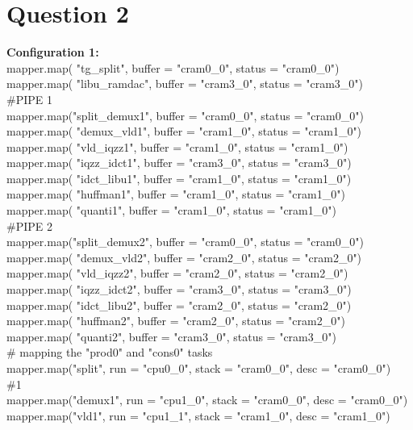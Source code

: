 \documentclass[12pt]{article}
\begin{document}
\section*{Question 2}
\textbf{Configuration 1:}\\
mapper.map( "tg\_split",    buffer = "cram0\_0", status = "cram0\_0")\\
mapper.map( "libu\_ramdac", buffer = "cram3\_0", status = "cram3\_0")\\
\#PIPE 1\\
mapper.map("split\_demux1", buffer = "cram0\_0", status = "cram0\_0")\\
mapper.map( "demux\_vld1",  buffer = "cram1\_0", status = "cram1\_0")\\
mapper.map( "vld\_iqzz1",   buffer = "cram1\_0", status = "cram1\_0")\\
mapper.map( "iqzz\_idct1",  buffer = "cram3\_0", status = "cram3\_0")\\
mapper.map( "idct\_libu1",  buffer = "cram1\_0", status = "cram1\_0")\\
mapper.map( "huffman1",    buffer = "cram1\_0", status = "cram1\_0")\\
mapper.map( "quanti1",     buffer = "cram1\_0", status = "cram1\_0")\\
\#PIPE 2\\
mapper.map("split\_demux2", buffer = "cram0\_0", status = "cram0\_0")\\
mapper.map( "demux\_vld2",  buffer = "cram2\_0", status = "cram2\_0")\\
mapper.map( "vld\_iqzz2",   buffer = "cram2\_0", status = "cram2\_0")\\
mapper.map( "iqzz\_idct2",  buffer = "cram3\_0", status = "cram3\_0")\\
mapper.map( "idct\_libu2",  buffer = "cram2\_0", status = "cram2\_0")\\
mapper.map( "huffman2",    buffer = "cram2\_0", status = "cram2\_0")\\
mapper.map( "quanti2",     buffer = "cram3\_0", status = "cram3\_0")\\
\# mapping the "prod0" and "cons0" tasks\\
mapper.map("split",  run = "cpu0\_0", stack = "cram0\_0", desc  = "cram0\_0")\\
\#1\\
mapper.map("demux1", run = "cpu1\_0", stack = "cram0\_0", desc  = "cram0\_0")\\
mapper.map("vld1",   run = "cpu1\_1", stack = "cram1\_0", desc  = "cram1\_0")\\
\end{document}
